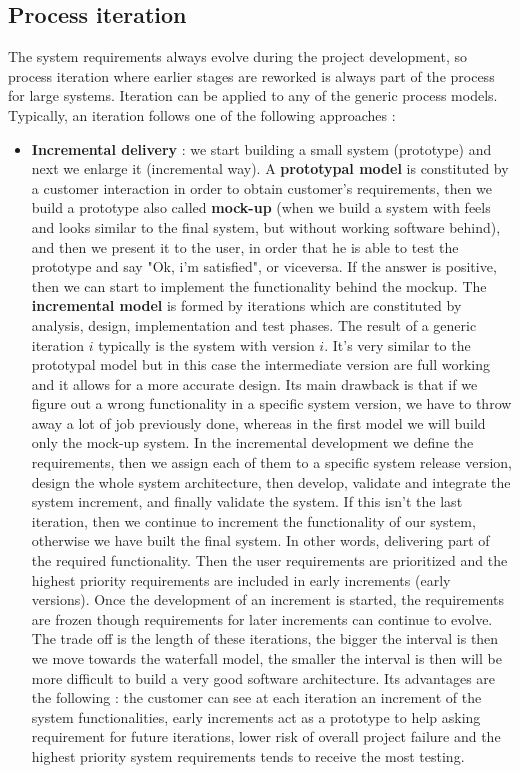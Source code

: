 \subsection{Process iteration}
The system requirements always evolve during the project development, so process iteration where earlier stages are reworked is always part of the process for large systems. Iteration can be applied to any of the generic process models. Typically, an iteration follows one of the following approaches :
\begin{itemize}
    \item \textbf{Incremental delivery} : we start building a small system (prototype) and next we enlarge it (incremental way). A \textbf{prototypal model} is constituted by a customer interaction in order to obtain customer's requirements, then we build a prototype also called \textbf{mock-up}  (when we build a system with feels and looks similar to the final system, but without working software behind), and then we present it to the user, in order that he is able to test the prototype and say "Ok, i'm satisfied", or viceversa. If the answer is positive, then we can start to implement the functionality behind the mockup. The \textbf{incremental model} is formed by iterations which are constituted by analysis, design, implementation and test phases. The result of a generic iteration $i$ typically is the system with version $i$. It's very similar to the prototypal model but in this case the intermediate version are full working and it allows for a more accurate design. Its main drawback is that if we figure out a wrong functionality in a specific system version, we have to throw away a lot of job previously done, whereas in the first model we will build only the mock-up system. In the incremental development we define the requirements, then we assign each of them to a specific system release version, design the whole system architecture, then develop, validate and integrate the system increment, and finally validate the system. If this isn't the last iteration, then we continue to increment the functionality of our system, otherwise we have built the final system. In other words, delivering part of the required functionality. Then the user requirements are prioritized and the highest priority requirements are included in early increments (early versions). Once the development of an increment is started, the requirements are frozen though requirements for later increments can continue to evolve. The trade off is the length of these iterations, the bigger the interval is then we move towards the waterfall model, the smaller the interval is then will be more difficult to build a very good software architecture. Its advantages are the following : the customer can see at each iteration an increment of the system functionalities, early increments act as a prototype to help asking requirement for future iterations, lower risk of overall project failure and the highest priority system requirements tends to receive the most testing.

\end{itemize}
